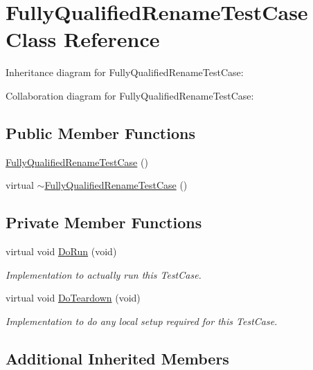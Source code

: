 \hypertarget{classFullyQualifiedRenameTestCase}{}\section{Fully\+Qualified\+Rename\+Test\+Case Class Reference}
\label{classFullyQualifiedRenameTestCase}


Inheritance diagram for Fully\+Qualified\+Rename\+Test\+Case\+:


Collaboration diagram for Fully\+Qualified\+Rename\+Test\+Case\+:
\subsection*{Public Member Functions}
\begin{DoxyCompactItemize}
\item 
\hyperlink{classFullyQualifiedRenameTestCase_a04af8602d19d5ca42bc7547b3013b263}{Fully\+Qualified\+Rename\+Test\+Case} ()
\item 
virtual \hyperlink{classFullyQualifiedRenameTestCase_ae319828f724e035317f871b1fadab236}{$\sim$\+Fully\+Qualified\+Rename\+Test\+Case} ()
\end{DoxyCompactItemize}
\subsection*{Private Member Functions}
\begin{DoxyCompactItemize}
\item 
virtual void \hyperlink{classFullyQualifiedRenameTestCase_a30e1bac83cf5030b7b6481a1912e8d59}{Do\+Run} (void)
\begin{DoxyCompactList}\small\item\em Implementation to actually run this Test\+Case. \end{DoxyCompactList}\item 
virtual void \hyperlink{classFullyQualifiedRenameTestCase_aae8e4d8375983fc6c525c7b331ed742b}{Do\+Teardown} (void)
\begin{DoxyCompactList}\small\item\em Implementation to do any local setup required for this Test\+Case. \end{DoxyCompactList}\end{DoxyCompactItemize}
\subsection*{Additional Inherited Members}


